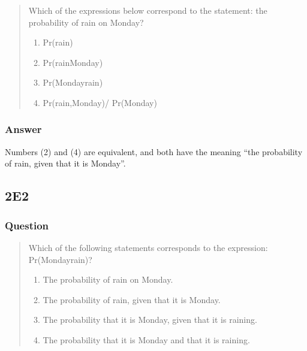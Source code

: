 \documentclass[
]{book}
\providecommand{\tightlist}{%
  \setlength{\itemsep}{0pt}\setlength{\parskip}{0pt}}
\begin{document}
\begin{quote}
Which of the expressions below correspond to the statement: the probability of rain on Monday?

\begin{enumerate}
\def\labelenumi{(\arabic{enumi})}
\tightlist
\item
  Pr(rain)
\item
  Pr(rain\textbar Monday)
\item
  Pr(Monday\textbar rain)
\item
  Pr(rain,Monday)/ Pr(Monday)
\end{enumerate}
\end{quote}

\hypertarget{answer}{%
\subsubsection*{Answer}\label{answer}}

Numbers (2) and (4) are equivalent, and both have the meaning ``the probability of rain, given that it is Monday''.

\hypertarget{e2}{%
\subsection*{2E2}\label{e2}}

\hypertarget{question-1}{%
\subsubsection*{Question}\label{question-1}}

\begin{quote}
Which of the following statements corresponds to the expression: Pr(Monday\textbar rain)?

\begin{enumerate}
\def\labelenumi{(\arabic{enumi})}
\tightlist
\item
  The probability of rain on Monday.
\item
  The probability of rain, given that it is Monday.
\item
  The probability that it is Monday, given that it is raining.
\item
  The probability that it is Monday and that it is raining.
\end{enumerate}
\end{quote}
\end{document}
